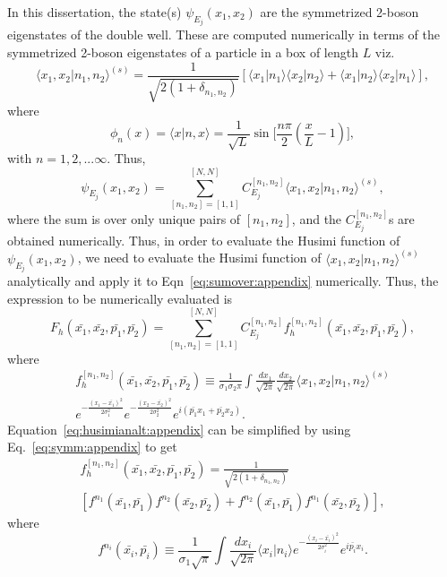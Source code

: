 In this dissertation, the state(s) $\psi_{E_j}(x_1,x_2)$ are the symmetrized 2-boson eigenstates of the double well. These are computed numerically in terms of the symmetrized 2-boson eigenstates of a particle in a box of length $L$ viz.
%
\begin{equation}
{\langle}x_1,x_2\vert n_1,n_2{\rangle} ^{(s)}=\frac{1}{\sqrt{2(1+\delta_{n_1,n_2})}} 
[{\langle}x_1|n_1\rangle{\langle}x_2|n_2\rangle +{\langle}x_1|n_2\rangle{\langle}x_2|n_1\rangle ],
\label{eq:symm:appendix}
\end{equation}
where
%
\begin{equation}
\phi_n(x)=\langle x|n,x\rangle=\frac{1}{\sqrt{L}} \sin{\biggl[}{\frac{n\pi}{2}(\frac{x}{L}-1){\biggr]}},
\label{eq:pboxfn:appendixhusimi}
\end{equation}
%
with $n=1,2,...\infty$. Thus,
\begin{equation}
\psi_{E_j}(x_1,x_2) = \sum_{\left[n_1,n_2\right]=\left[1,1\right]}^{\left[ N,N \right]} C^{\left[n_1,n_2 \right]}_{E_j} {\langle}x_1,x_2\vert n_1,n_2{\rangle} ^{(s)},
\label{eq:sumover:appendix}
\end{equation}
where the sum is over only unique pairs of $\left[ n_1, n_2 \right]$, and the $C^{\left[n_1,n_2 \right]}_{E_j}$s are obtained numerically. Thus, in order to evaluate the Husimi function of $\psi_{E_j}(x_1,x_2)$, we need to evaluate the Husimi function of ${\langle}x_1,x_2\vert n_1,n_2{\rangle} ^{(s)}$ analytically and apply it to Eqn~\ref{eq:sumover:appendix} numerically. Thus, the expression to be numerically evaluated is
\begin{equation}
F_h(\bar{x_1},\bar{x_2},\bar{p_1},\bar{p_2})= \sum_{\left[n_1,n_2\right]=\left[1,1\right]}^{\left[ N,N \right]} C^{\left[n_1,n_2 \right]}_{E_j} f^{\left[n_1,n_2\right]}_h(\bar{x_1},\bar{x_2},\bar{p_1},\bar{p_2}),
\label{eq:husiminum:appendix}
\end{equation}
where
\begin{multline}
 f^{\left[n_1,n_2\right]}_h(\bar{x_1},\bar{x_2},\bar{p_1},\bar{p_2}) \equiv \frac{1}{\sigma_1 \sigma_2 \pi} \int \frac{dx_1}{\sqrt{2\pi}} \frac{dx_2}{\sqrt{2\pi}} {\langle}x_1,x_2\vert n_1,n_2{\rangle} ^{(s)} \\
e^{-\frac{(x_1-\bar{x_1})^2}{2\sigma^2_1}} e^{-\frac{(x_2-\bar{x_2})^2}{2\sigma^2_2}} e^{i (\bar{p_1}x_1 + \bar{p_2}x_2)}.
\label{eq:husimianalt:appendix}
\end{multline}
Equation~\ref{eq:husimianalt:appendix} can be simplified by using Eq.~\ref{eq:symm:appendix} to get
\begin{multline}
 f^{\left[n_1,n_2\right]}_h(\bar{x_1},\bar{x_2},\bar{p_1},\bar{p_2}) = \frac{1}{\sqrt{2(1+\delta_{n_1,n_2})}} \\
[ f^{n_1}(\bar{x_1},\bar{p_1})  f^{n_2}(\bar{x_2},\bar{p_2}) +  f^{n_2}(\bar{x_1},\bar{p_1})  f^{n_1}(\bar{x_2},\bar{p_2}) ],
\label{eq:husimibrk:appendix}
\end{multline}
where
\begin{equation}
 f^{n_i}(\bar{x_i},\bar{p_i}) \equiv  \frac{1}{\sigma_1 \sqrt{\pi}} \int \frac{dx_i}{\sqrt{2\pi}} {\langle}x_i\vert n_i{\rangle} e^{-\frac{(x_i-\bar{x_i})^2}{2\sigma^2_i}} e^{i \bar{p_i}x_i }.
 \label{eq:husimi:sp:appendix}
\end{equation}

